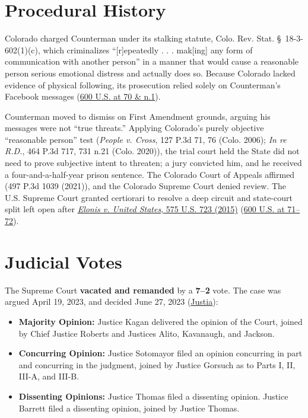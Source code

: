 \documentclass[12pt]{article}
\begin{document}
\section{Procedural History}
Colorado charged Counterman under its stalking statute, Colo. Rev. Stat. \S~18-3-602(1)(c), which criminalizes ``[r]epeatedly . . . mak[ing] any form of communication with another person'' in a manner that would cause a reasonable person serious emotional distress and actually does so. Because Colorado lacked evidence of physical following, its prosecution relied solely on Counterman's Facebook messages (\href{https://supreme.justia.com/cases/federal/us/600/22-138/}{600 U.S. at 70 \& n.1}).

Counterman moved to dismiss on First Amendment grounds, arguing his messages were not ``true threats.'' Applying Colorado's purely objective ``reasonable person'' test (\textit{People v. Cross}, 127 P.3d 71, 76 (Colo. 2006); \textit{In re R.D.}, 464 P.3d 717, 731 n.21 (Colo. 2020)), the trial court held the State did not need to prove subjective intent to threaten; a jury convicted him, and he received a four-and-a-half-year prison sentence. The Colorado Court of Appeals affirmed (497 P.3d 1039 (2021)), and the Colorado Supreme Court denied review. The U.S. Supreme Court granted certiorari to resolve a deep circuit and state-court split left open after \href{https://supreme.justia.com/cases/federal/us/575/723/}{\textit{Elonis v. United States}, 575 U.S. 723 (2015)} (\href{https://supreme.justia.com/cases/federal/us/600/22-138/}{600 U.S. at 71--72}).

\section{Judicial Votes}
The Supreme Court \textbf{vacated and remanded} by a \textbf{7--2} vote. The case was argued April 19, 2023, and decided June 27, 2023 (\href{https://supreme.justia.com/cases/federal/us/600/22-138/}{Justia}):

\begin{itemize}
    \item \textbf{Majority Opinion:} Justice Kagan delivered the opinion of the Court, joined by Chief Justice Roberts and Justices Alito, Kavanaugh, and Jackson.
    \item \textbf{Concurring Opinion:} Justice Sotomayor filed an opinion concurring in part and concurring in the judgment, joined by Justice Gorsuch as to Parts I, II, III-A, and III-B.
    \item \textbf{Dissenting Opinions:} Justice Thomas filed a dissenting opinion. Justice Barrett filed a dissenting opinion, joined by Justice Thomas.
\end{itemize}
\end{document}
